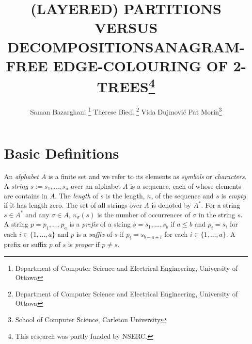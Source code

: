 \documentclass[kpfonts]{patmorin}
\title{\MakeUppercase{(Layered) Partitions versus Decompositions}}
\author{}
\title{\MakeUppercase{Anagram-Free Edge-Colouring of 2-Trees}\thanks{This research was partly funded by NSERC.}}
\author{Saman Bazarghani%
    \thanks{Department of Computer Science and Electrical Engineering, University of Ottawa}\qquad
    Therese Biedl%
    \thanks{Department of Computer Science and Electrical Engineering, University of Ottawa}\qquad
    Vida Dujmović\footnotemark[2]\qquad
    Pat Morin\footnotemark[3]%
    \thanks{School of Computer Science, Carleton University}}
\DeclareMathOperator{\ddiv}{div}
\begin{document}
\maketitle

%
%
%
%
%
%

\section{Basic Definitions}

An \emph{alphabet} $A$ is a finite set and we refer to its elements as \emph{symbols} or \emph{characters}.  A \emph{string} $s:=s_1,\ldots,s_n$ over an alphabet $A$ is a sequence, each of whose elements are contains in $A$.  The \emph{length} of $s$ is the length, $n$, of the sequence and $s$ is \emph{empty} if it has length zero.  The set of all strings over $A$ is denoted by $A^*$.  For a string $s\in A^*$ and any $\sigma\in A$, $n_\sigma(s)$ is the number of occurrences of $\sigma$ in the string $s$.  A string $p=p_1,\ldots,p_a$ is a \emph{prefix} of a string $s=s_1,\ldots,s_b$ if $a\le b$ and $p_i=s_i$ for each $i\in\{1,\ldots,a\}$ and $p$ is a \emph{suffix} of $s$ if $p_i=s_{b-a+i}$ for each $i\in\{1,\ldots,a\}$. A  prefix or suffix $p$ of $s$ is \emph{proper} if $p\neq s$.
\end{document}
